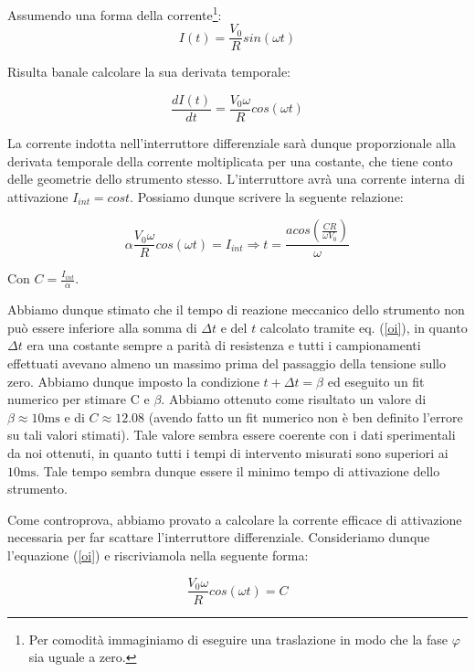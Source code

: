 Assumendo una forma della corrente\footnote{Per comodità immaginiamo di eseguire una traslazione in modo che la fase $\varphi$ sia uguale a zero.}:
\begin{equation}
I(t)=\frac{V_0}{R}sin(\omega t)
\label{corrente}
\end{equation}

Risulta banale calcolare la sua derivata temporale:

\begin{equation}
\frac{dI(t)}{dt}=\frac{V_0 \omega}{R}cos(\omega t)
\end{equation}

La corrente indotta nell'interruttore differenziale sarà dunque proporzionale alla derivata temporale della corrente moltiplicata per una costante, che tiene conto delle geometrie dello strumento stesso. L'interruttore avrà una corrente interna di attivazione $I_{int}=cost$. Possiamo dunque scrivere la seguente relazione:

\begin{equation}
\alpha \frac{V_0 \omega}{R}cos(\omega t)=I_{int} \Rightarrow t=\frac{acos(\frac{C R}{\omega V_0})}{\omega }
\label{oi}
\end{equation} 

Con $C=\frac{I_{int}}{\alpha}$.

Abbiamo dunque stimato che il tempo di reazione meccanico dello strumento non può essere inferiore alla somma di $\Delta t$ e del $t$ calcolato tramite eq. (\ref{oi}), in quanto $\Delta t$ era una costante sempre a parità di resistenza e tutti i campionamenti effettuati avevano almeno un massimo prima del passaggio della tensione sullo zero. Abbiamo dunque imposto la condizione $t+\Delta t = \beta$ ed eseguito un fit numerico per stimare C e $\beta$. Abbiamo ottenuto come risultato un valore di $\beta \approx 10 \si{\milli \second}$ e di $C \approx 12.08$ (avendo fatto un fit numerico non è ben definito l'errore su tali valori stimati). Tale valore sembra essere coerente con i dati sperimentali da noi ottenuti, in quanto tutti i tempi di intervento misurati sono superiori ai $10 \si{\milli \second}$. Tale tempo sembra dunque essere il minimo tempo di attivazione dello strumento. 
 
 
Come controprova, abbiamo provato a calcolare la corrente efficace di attivazione necessaria per far scattare l'interruttore differenziale. Consideriamo dunque l'equazione (\ref{oi}) e riscriviamola nella seguente forma:

\begin{equation}
\frac{V_0 \omega}{R}cos(\omega t)=C
\label{lol}
\end{equation}

